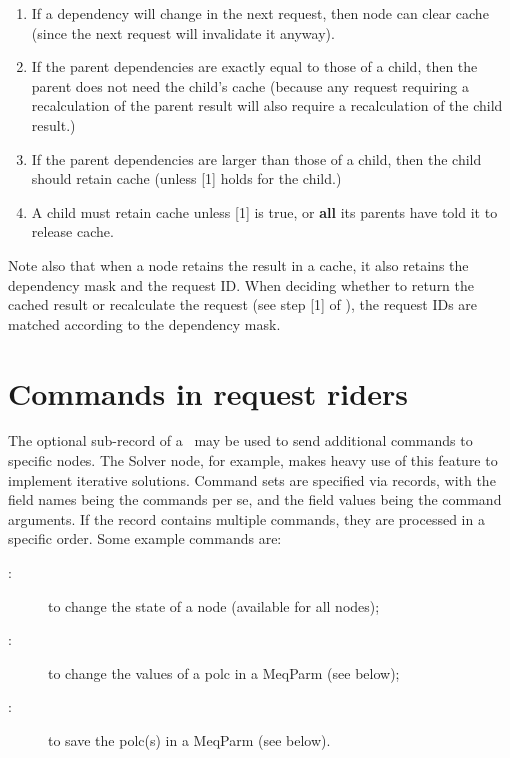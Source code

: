 \documentclass[10pt,twoside]{book}
\begin{document}
  \begin{enumerate}
  
  \item If a dependency will change in the next request, then node can clear
    cache (since the next request will invalidate it anyway).

  \item If the parent dependencies are exactly equal to those of a child, then
    the parent does not need the child's cache (because any request requiring a
    recalculation of the parent result will also require a recalculation of the
    child result.)

  \item If the parent dependencies are larger than those of a child, then the 
    child should retain cache (unless [1] holds for the child.) 

  \item A child must retain cache unless [1] is true, or {\bf all} its parents
    have told it to release cache.

  \end{enumerate}
  
  Note also that when a node retains the result in a cache, it also retains the
  dependency mask and the request ID. When deciding whether to return the
  cached result or recalculate the request (see step [1] of ),
  the request IDs are matched according to the dependency mask.
  
\section{Commands in request riders}

  The optional  sub-record of a \Request\ may be used to send
  additional commands to specific nodes. The Solver node, for example, makes
  heavy use of this feature to implement iterative solutions. Command sets are
  specified via records, with the field names being the commands per se, and
  the field values being the command arguments. If the record contains multiple
  commands, they are processed in a specific order. Some example commands are:

  \begin{description}
  
  \item[:] to change the state of a node (available for all nodes);
  
  \item[:] to change the values of a polc in a MeqParm (see
  below);
  
  \item[:] to save the polc(s) in a MeqParm (see below).
  
  \end{description}
  
\end{document}
